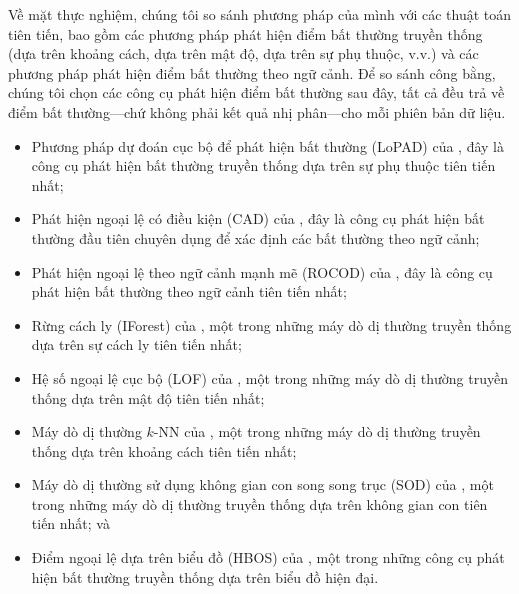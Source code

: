 Về mặt thực nghiệm, chúng tôi so sánh phương pháp của mình với các thuật toán tiên tiến, bao gồm các phương pháp phát hiện điểm bất thường truyền thống (dựa trên khoảng cách, dựa trên mật độ, dựa trên sự phụ thuộc, v.v.) và các phương pháp phát hiện điểm bất thường theo ngữ cảnh. Để so sánh công bằng, chúng tôi chọn các công cụ phát hiện điểm bất thường sau đây, tất cả đều trả về điểm bất thường---chứ không phải kết quả nhị phân---cho mỗi phiên bản dữ liệu.
\begin{itemize}
    \item Phương pháp dự đoán cục bộ để phát hiện bất thường (LoPAD) của \cite{lu2020lopad}, đây là công cụ phát hiện bất thường truyền thống dựa trên sự phụ thuộc tiên tiến nhất;
    \item Phát hiện ngoại lệ có điều kiện (CAD) của \cite{song2007conditional}, đây là công cụ phát hiện bất thường đầu tiên chuyên dụng để xác định các bất thường theo ngữ cảnh;
    \item Phát hiện ngoại lệ theo ngữ cảnh mạnh mẽ (ROCOD) của \cite{liang2016robust}, đây là công cụ phát hiện bất thường theo ngữ cảnh tiên tiến nhất;
    \item Rừng cách ly (IForest) của \cite{liu2008isolation}, một trong những máy dò dị thường truyền thống dựa trên sự cách ly tiên tiến nhất;
    \item Hệ số ngoại lệ cục bộ (LOF) của \cite{breunig2000lof}, một trong những máy dò dị thường truyền thống dựa trên mật độ tiên tiến nhất;
    \item Máy dò dị thường $k$-NN của \cite{angiulli2002fast}, một trong những máy dò dị thường truyền thống dựa trên khoảng cách tiên tiến nhất;
    \item Máy dò dị thường sử dụng không gian con song song trục (SOD) của \cite{kriegel2009outlier}, một trong những máy dò dị thường truyền thống dựa trên không gian con tiên tiến nhất; và
    \item Điểm ngoại lệ dựa trên biểu đồ (HBOS) của \cite{goldstein2012histogram}, một trong những công cụ phát hiện bất thường truyền thống dựa trên biểu đồ hiện đại.

\end{itemize}
